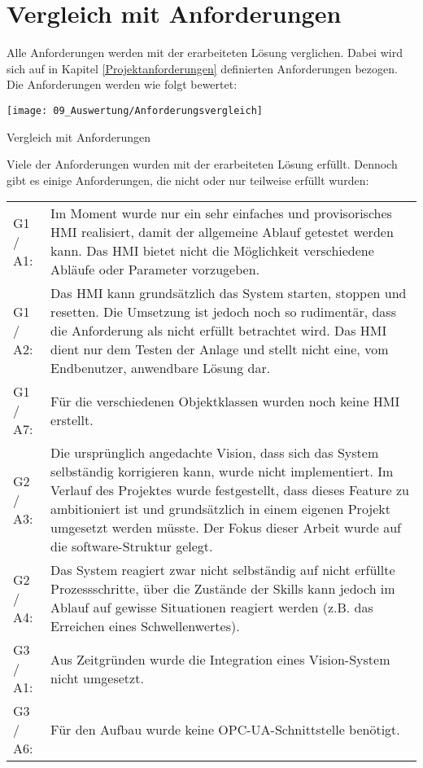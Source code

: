 \section{Vergleich mit Anforderungen} \label{Anforderungsvergleich}

	Alle Anforderungen werden mit der erarbeiteten Lösung verglichen. Dabei wird sich auf in Kapitel \ref{Projektanforderungen} definierten Anforderungen bezogen.  Die Anforderungen werden wie folgt bewertet:
	\begin{table}[H]
		\centering
		\texttt{[image: 09\_Auswertung/Anforderungsvergleich]}
		\captionsetup{justification=centering}
		\caption{Vergleich mit Anforderungen}
		\label{tab:Anforderungsvergleich}
	\end{table}
	
	Viele der Anforderungen wurden mit der erarbeiteten Lösung erfüllt. Dennoch gibt es einige
	Anforderungen, die nicht oder nur teilweise erfüllt wurden:
	
	\begin{tabularx}{\textwidth}{@{}>{}p{4em} X@{}}
		G1 / A1: & 
		Im Moment wurde nur ein sehr einfaches und provisorisches HMI realisiert, damit der allgemeine Ablauf getestet werden kann. Das HMI bietet nicht die Möglichkeit verschiedene Abläufe oder Parameter vorzugeben.
		\\
		G1 / A2: & 
		Das HMI kann grundsätzlich das System starten, stoppen und resetten. Die Umsetzung ist jedoch noch so rudimentär, dass die Anforderung als nicht erfüllt betrachtet wird. Das HMI dient nur dem Testen der Anlage und stellt nicht eine, vom Endbenutzer, anwendbare Lösung dar. 
		\\
		G1 / A7: & 
		Für die verschiedenen Objektklassen wurden noch keine HMI erstellt. 
		\\
		G2 / A3: & 
		Die ursprünglich angedachte Vision, dass sich das System selbständig korrigieren kann, wurde nicht implementiert. Im Verlauf des Projektes wurde festgestellt, dass dieses Feature zu ambitioniert ist und grundsätzlich in einem eigenen Projekt umgesetzt werden müsste. Der Fokus dieser Arbeit wurde auf die software-Struktur gelegt. 
		\\
		G2 / A4: & 
		Das System reagiert zwar nicht selbständig auf nicht erfüllte Prozessschritte, über die Zustände der Skills kann jedoch im Ablauf auf gewisse Situationen reagiert werden (z.B. das Erreichen eines Schwellenwertes).
		\\
		G3 / A1: & 
		Aus Zeitgründen wurde die Integration eines Vision-System nicht umgesetzt.
		\\
		G3 / A6: & 
		Für den Aufbau wurde keine OPC-UA-Schnittstelle benötigt. 
		\\
	\end{tabularx}
	
	
	\newpage